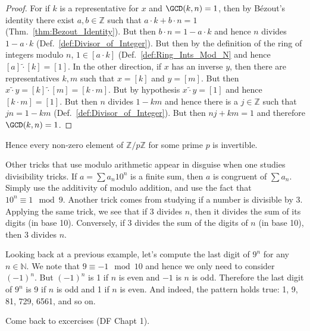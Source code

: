 \documentclass{article}                                                        %
\begin{document}
            \begin{proof}
                For if $k$ is a representative for $x$ and $\GCD(k,n)=1$, then
                by B\'{e}zout's identity there exist $a,b\in\mathbb{Z}$ such
                that $a\cdot{k}+b\cdot{n}=1$ (Thm.~\ref{thm:Bezout_Identity}).
                But then $b\cdot{n}=1-a\cdot{k}$ and hence $n$ divides
                $1-a\cdot{k}$ (Def.~\ref{def:Divisor_of_Integer}). But then by
                the definition of the ring of integers modulo $n$,
                $1\in[a\cdot{k}]$ (Def.~\ref{def:Ring_Ints_Mod_N} and
                hence $[a]\tilde{\cdot}[k]=[1]$. In the other direction, if
                $x$ has an inverse $y$, then there are representatives $k,m$
                such that $x=[k]$ and $y=[m]$. But then
                $x\tilde{\cdot}{y}=[k]\tilde{\cdot}[m]=[k\cdot{m}]$. But by
                hypothesis $x\tilde{\cdot}{y}=[1]$ and hence $[k\cdot{m}]=[1]$.
                But then $n$ divides $1-km$ and hence there is a
                $j\in\mathbb{Z}$ such that $jn=1-km$
                (Def.~\ref{def:Divisor_of_Integer}). But then $nj+km=1$ and
                therefore $\GCD(k,n)=1$.
            \end{proof}
            Hence every non-zero element of $\mathbb{Z}/p\mathbb{Z}$ for some prime
            $p$ is invertible.
            \begin{example}
                Other tricks that use modulo arithmetic appear in disguise when one
                studies divisibility tricks. If $a=\sum{a}_{n}10^{n}$ is a finite
                sum, then $a$ is congruent of $\sum{a}_{n}$. Simply use the
                additivity of modulo addition, and use the fact that
                $10^{n}\equiv{1}\mod{9}$. Another trick comes from studying if a
                number is divisible by 3. Applying the same trick, we see that if
                3 divides $n$, then it divides the sum of its digits (in base 10).
                Conversely, if 3 divides the sum of the digits of $n$ (in base 10),
                then 3 divides $n$.
            \end{example}
            \begin{example}
                Looking back at a previous example, let's compute the last digit of
                $9^{n}$ for any $n\in\mathbb{N}$. We note that
                $9\equiv\minus{1}\mod{10}$ and hence we only need to consider
                $(\minus{1})^{n}$. But $(\minus{1})^{n}$ is 1 if $n$ is even and
                $\minus{1}$ is $n$ is odd. Therefore the last digit of $9^{n}$ is
                9 if $n$ is odd and 1 if $n$ is even. And indeed, the pattern holds
                true: 1, 9, 81, 729, 6561, and so on.
            \end{example}
            Come back to excercises (DF Chapt 1).
\end{document}
